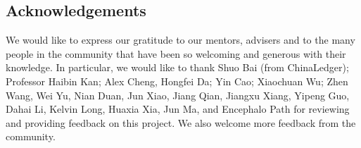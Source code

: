\documentclass[UTF8,nofonts]{article}
\begin{document}
\begin{multicols}{2}
\section{Acknowledgements}
We would like to express our gratitude to our mentors, advisers and to the many people in the community that have been so welcoming and generous with their knowledge. In particular, we would like to thank Shuo Bai (from ChinaLedger); Professor Haibin Kan; Alex Cheng, Hongfei Da; Yin Cao; Xiaochuan Wu; Zhen Wang, Wei Yu, Nian Duan, Jun Xiao, Jiang Qian, Jiangxu Xiang, Yipeng Guo, Dahai Li, Kelvin Long, Huaxia Xia, Jun Ma, and Encephalo Path for reviewing and providing feedback on this project. We also welcome more feedback from the community.







\end{multicols}

\newpage
\end{document}
